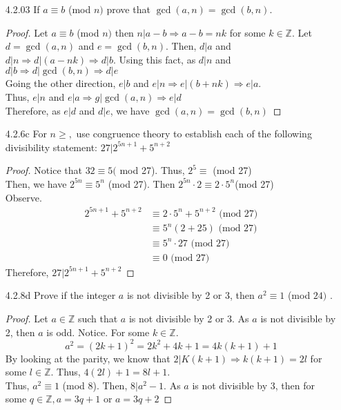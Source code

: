 \documentclass[12pt]{article}
\newcommand{\Z}{\mathds{Z}}
\begin{document}
\begin{enumerate}
	\item[4.2.03] If $ a \equiv b $ (mod $ n ) $ prove that $ \gcd(a,n) = \gcd(b,n) $.
	\begin{proof}
		Let $ a \equiv b $ (mod $ n ) $ then $ n | a-b \Rightarrow a-b = nk $ for some $ k\in\Z $. Let $ d = \gcd(a,n) $ and $ e = \gcd(b,n) $. Then, $ d | a $ and $ d|n \Rightarrow d |(a-nk) \Rightarrow d|b$. Using this fact, as $ d | n $ and $ d | b  \Rightarrow d | \gcd(b,n) \Rightarrow d | e $ \\
		Going the other direction, $ e | b $ and $ e | n \Rightarrow e|(b+nk)\Rightarrow e|a$.\\
		Thus, $ e|n $ and $ e|a \Rightarrow g|\gcd(a,n) \Rightarrow e|d $\\
		Therefore, as $ e|d $ and $ d|e $, we have $ \gcd(a,n) = \gcd(b,n) $ 
	\end{proof}
	\item[4.2.6c] For $ n \geq, $ use congruence theory to establish each of the following divisibility statement: $ 27 | 2^{5n+1} + 5^{n+2} $
	\begin{proof}
		Notice that $ 32 \equiv 5 ($ mod 27). Thus, $ 2^5 \equiv $ (mod 27)\\
		Then, we have $ 2^{5n} \equiv 5^n $ (mod 27). Then $ 2^{5n}\cdot 2 \equiv 2 \cdot 5^n $(mod 27)\\
		Observe.
		\begin{align*}
			2^{5n+1}+5^{n+2} &\equiv 2\cdot 5^n + 5^{n+2} \text{ (mod 27)}\\
			                 &\equiv 5^n (2 + 25) \text{ (mod 27)}\\
			                 &\equiv 5^n \cdot 27 \text{ (mod 27)}\\
			                 &\equiv 0 \text{ (mod 27)}
		\end{align*}
		Therefore, $ 27 | 2^{5n+1} + 5^{n+2} $
	\end{proof}
	\item[4.2.8d] Prove if the integer $ a $ is not divisible by 2 or 3, then $ a^2 \equiv 1 $ (mod $ 24 ) $ .
		\begin{proof}
			Let $ a\in \Z $ such that $ a $ is not divisible by 2 or 3. As $ a $ is not divisible by 2, then $ a $ is odd. Notice. For some $ k\in\Z. $
			\[a^2=(2k+1)^2=2k^2+4k+1=4k(k+1)+1\]
			By looking at the parity, we know that $ 2|K(k+1)\Rightarrow k(k+1)=2l $ for some $ l \in \Z $.
			Thus, $ 4(2l)+1=8l+1 $.\\
			Thus, $ a^2 \equiv 1$ (mod 8). Then, $ 8|a^2-1 $. As $ a $ is not divisible by 3, then for some $ q\in\Z, a=3q+1 $ or $ a=3q+2 $

\end{proof}
\end{enumerate}
\end{document}
